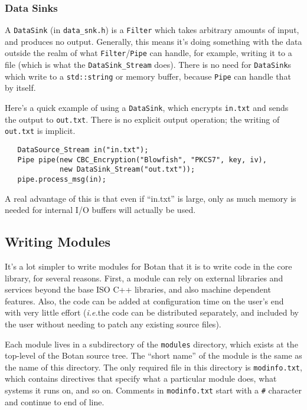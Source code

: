 \documentclass{article}
\newcommand{\filename}[1]{\texttt{#1}}
\newcommand{\type}[1]{\texttt{#1}}
\newcommand{\ie}[0]{\emph{i.e.}}
\begin{document}
\subsubsection{Data Sinks}

A \type{DataSink} (in \filename{data\_snk.h}) is a \type{Filter} which takes
arbitrary amounts of input, and produces no output. Generally, this means it's
doing something with the data outside the realm of what
\type{Filter}/\type{Pipe} can handle, for example, writing it to a file (which
is what the \type{DataSink\_Stream} does). There is no need for
\type{DataSink}s which write to a \type{std::string} or memory buffer, because
\type{Pipe} can handle that by itself.

Here's a quick example of using a \type{DataSink}, which encrypts
\filename{in.txt} and sends the output to \filename{out.txt}. There is
no explicit output operation; the writing of \filename{out.txt} is
implicit.

\begin{verbatim}
   DataSource_Stream in("in.txt");
   Pipe pipe(new CBC_Encryption("Blowfish", "PKCS7", key, iv),
             new DataSink_Stream("out.txt"));
   pipe.process_msg(in);
\end{verbatim}

A real advantage of this is that even if ``in.txt'' is large, only as
much memory is needed for internal I/O buffers will actually be used.

\subsection{Writing Modules}

It's a lot simpler to write modules for Botan that it is to write code
in the core library, for several reasons. First, a module can rely on
external libraries and services beyond the base ISO C++ libraries, and
also machine dependent features. Also, the code can be added at
configuration time on the user's end with very little effort (\ie the
code can be distributed separately, and included by the user without
needing to patch any existing source files).

Each module lives in a subdirectory of the \filename{modules}
directory, which exists at the top-level of the Botan source tree. The
``short name'' of the module is the same as the name of this
directory. The only required file in this directory is
\filename{modinfo.txt}, which contains directives that specify what a
particular module does, what systems it runs on, and so on. Comments
in \filename{modinfo.txt} start with a \verb|#| character and continue
to end of line.
\end{document}
